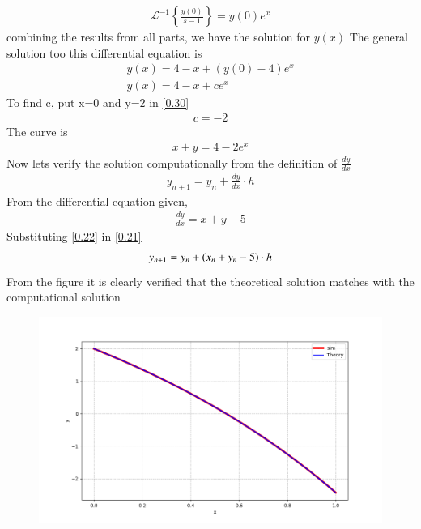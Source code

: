 \documentclass[journal]{IEEEtran}
\begin{document}
\begin{align}
    \mathcal{L}^{-1}\left\{ \frac{y(0)}{s - 1} \right\} = y(0) e^x
\end{align}
combining the results from all parts, we have the solution for $y(x)$
The general solution too this differential equation is 
\begin{align}
    y(x) = 4 - x + (y(0) - 4) e^x \\
    y(x) = 4 - x + c  e^x
    \label{0.30}
\end{align}
To find c, put x=0 and y=2 in \ref{0.30}
\begin{align}
    c = -2  
\end{align}
The curve is 
\begin{align}
   x+y = 4 -2e^x
\end{align}
Now lets verify the solution computationally from the definition of $\frac{dy}{dx}$
\begin{align}
    y_{n+1}= y_{n} + \frac{dy}{dx} \cdot h
    \label{0.21}
\end{align}
From the differential equation given,
\begin{align}
    \frac{dy}{dx} = x+y-5
    \label{0.22}
\end{align}
Substituting \ref{0.22} in \ref{0.21}
\begin{align}
    y_{n+1} = y_n + \left(x_n + y_n -5\right) \cdot h 
\end{align}
From the figure it is clearly verified that the theoretical solution matches with the computational solution\\
\begin{figure}
    \centering
    \includegraphics[width=\columnwidth]{figs/Figure_1.png}
\end{figure}
\end{document}
